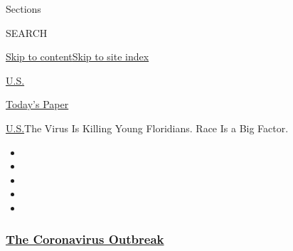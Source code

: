 Sections

SEARCH

\protect\hyperlink{site-content}{Skip to
content}\protect\hyperlink{site-index}{Skip to site index}

\href{https://www.nytimes3xbfgragh.onion/section/us}{U.S.}

\href{https://myaccount.nytimes3xbfgragh.onion/auth/login?response_type=cookie\&client_id=vi}{}

\href{https://www.nytimes3xbfgragh.onion/section/todayspaper}{Today's
Paper}

\href{/section/us}{U.S.}\textbar{}The Virus Is Killing Young Floridians.
Race Is a Big Factor.

\begin{itemize}
\item
\item
\item
\item
\item
\end{itemize}

\hypertarget{the-coronavirus-outbreak}{%
\subsubsection{\texorpdfstring{\href{https://www.nytimes3xbfgragh.onion/news-event/coronavirus?name=styln-coronavirus-national\&region=TOP_BANNER\&variant=undefined\&block=storyline_menu_recirc\&action=click\&pgtype=Article\&impression_id=c3e64bb0-e375-11ea-9198-f319f806a34f}{The
Coronavirus
Outbreak}}{The Coronavirus Outbreak}}\label{the-coronavirus-outbreak}}

